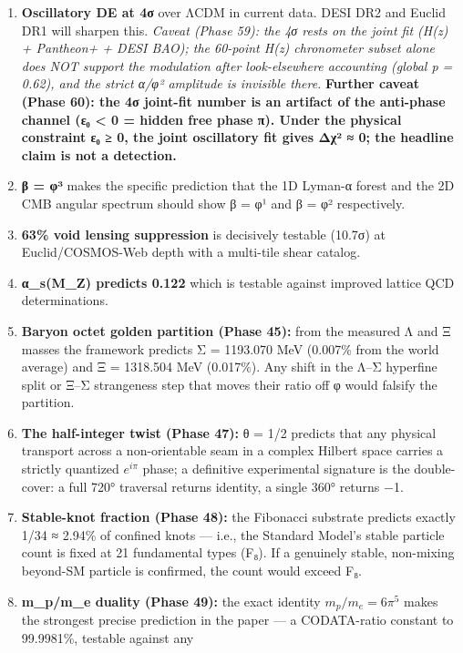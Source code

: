\documentclass[
]{article}
\providecommand{\tightlist}{%
  \setlength{\itemsep}{0pt}\setlength{\parskip}{0pt}}
\begin{document}
\begin{enumerate}
\def\labelenumi{\arabic{enumi}.}
\tightlist
\item
  \textbf{Oscillatory DE at 4σ} over ΛCDM in current data. DESI DR2 and
  Euclid DR1 will sharpen this. \emph{Caveat (Phase 59): the 4σ rests on
  the joint fit (H(z) + Pantheon+ + DESI BAO); the 60-point H(z)
  chronometer subset alone does NOT support the modulation after
  look-elsewhere accounting (global p = 0.62), and the strict α/φ²
  amplitude is invisible there.} \textbf{Further caveat (Phase 60): the
  4σ joint-fit number is an artifact of the anti-phase channel (ε₀
  \textless{} 0 = hidden free phase π). Under the physical constraint ε₀
  ≥ 0, the joint oscillatory fit gives Δχ² ≈ 0; the headline claim is
  not a detection.}
\item
  \textbf{β = φ³} makes the specific prediction that the 1D Lyman-α
  forest and the 2D CMB angular spectrum should show β = φ¹ and β = φ²
  respectively.
\item
  \textbf{63\% void lensing suppression} is decisively testable (10.7σ)
  at Euclid/COSMOS-Web depth with a multi-tile shear catalog.
\item
  \textbf{α\_s(M\_Z) predicts 0.122} which is testable against improved
  lattice QCD determinations.
\item
  \textbf{Baryon octet golden partition (Phase 45):} from the measured Λ
  and Ξ masses the framework predicts Σ = 1193.070 MeV (0.007\% from the
  world average) and Ξ = 1318.504 MeV (0.017\%). Any shift in the Λ--Σ
  hyperfine split or Ξ--Σ strangeness step that moves their ratio off φ
  would falsify the partition.
\item
  \textbf{The half-integer twist (Phase 47):} θ = 1/2 predicts that any
  physical transport across a non-orientable seam in a complex Hilbert
  space carries a strictly quantized \(e^{i\pi}\) phase; a definitive
  experimental signature is the double-cover: a full 720° traversal
  returns identity, a single 360° returns −1.
\item
  \textbf{Stable-knot fraction (Phase 48):} the Fibonacci substrate
  predicts exactly 1/34 ≈ 2.94\% of confined knots --- i.e., the
  Standard Model's stable particle count is fixed at 21 fundamental
  types (F₈). If a genuinely stable, non-mixing beyond-SM particle is
  confirmed, the count would exceed F₈.
\item
  \textbf{m\_p/m\_e duality (Phase 49):} the exact identity
  \(m_p/m_e = 6\pi^5\) makes the strongest precise prediction in the
  paper --- a CODATA-ratio constant to 99.9981\%, testable against any

\end{enumerate}
\end{document}
